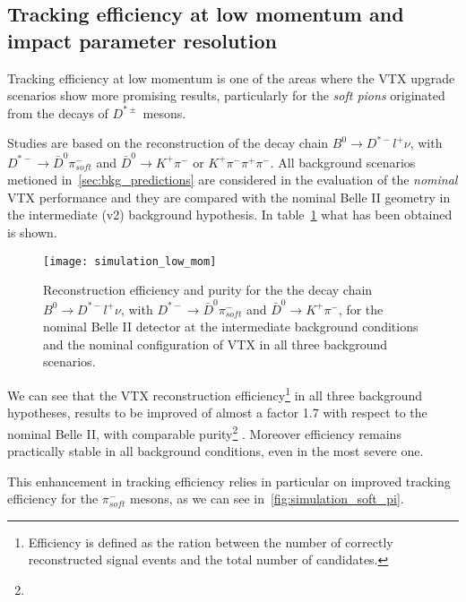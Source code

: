 \subsection{Tracking efficiency at low momentum and impact parameter resolution}

Tracking efficiency at low momentum is one of the areas where the VTX upgrade scenarios show more promising results, particularly for the \textit{soft pions} originated from the decays of $D^{*\pm}$ mesons.

Studies are based on the reconstruction of the decay chain $B^{0} \rightarrow D^{*-}l^{+}\nu$, with $D^{*-} \rightarrow \bar{D}^{0} \pi^{-}_{soft}$ and $\bar{D}^{0} \rightarrow K^{+} \pi^{-}$ or $K^{+} \pi^{-} \pi^{+} \pi^{-}$. All background scenarios metioned in~\autoref{sec:bkg_predictions} are considered in the evaluation of the \textit{nominal} VTX performance and they are compared with the nominal Belle II geometry in the intermediate (v2) background hypothesis. In table~\ref{fig:simulation_low_mom} what has been obtained is shown.

\begin{figure}[h!]
\centering
\texttt{[image: simulation\_low\_mom]}
\caption{Reconstruction efficiency and purity for the the decay chain $B^{0} \rightarrow D^{*-}l^{+}\nu$, with $D^{*-} \rightarrow \bar{D}^{0} \pi^{-}_{soft}$ and $\bar{D}^{0} \rightarrow K^{+} \pi^{-}$, for the nominal Belle II detector at the intermediate background conditions and the nominal configuration of VTX in all three background scenarios.}
\label{fig:simulation_low_mom}
\end{figure}

We can see that the VTX reconstruction efficiency\footnote{Efficiency is defined as the ration between the number of correctly reconstructed signal events and the total number of candidates.}  in all three background hypotheses, results to be improved of almost a factor 1.7 with respect to the nominal Belle II, with comparable purity\footnote{} . Moreover efficiency remains practically stable in all background conditions, even in the most severe one.

This enhancement in tracking efficiency relies in particular on improved tracking efficiency for the $\pi_{soft}^{-}$ mesons, as we can see in~\autoref{fig:simulation_soft_pi}.


